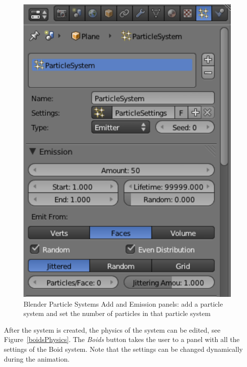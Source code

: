 \begin{figure}[htbp]
\begin{center}
\includegraphics[scale= 0.65]{figures/boidsCreatePS.pdf} 
\caption{Blender Particle Systems Add and Emission panels: add a particle system and set the number of particles in that particle system}
\label{boidsCreatePS}
\end{center}
\end{figure}

After the system is created, the physics of the system can be edited, see Figure~\ref{boidsPhysics}. The \textit{Boids} button takes the user to a panel with all the settings of the Boid system.  Note that the settings can be changed dynamically during the animation. 

